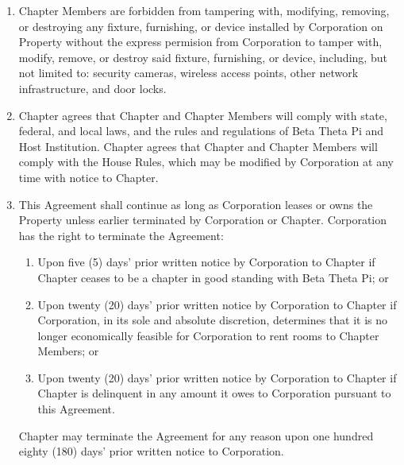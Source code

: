 \documentclass[12pt]{article}
\begin{document}
\begin{enumerate}
        \item Chapter Members are forbidden from tampering with, modifying, removing, or destroying any fixture, furnishing, or device installed by Corporation on Property without the express permision from Corporation to tamper with, modify, remove, or destroy said fixture, furnishing, or device, including, but not limited to: security cameras, wireless access points, other network infrastructure, and door locks.

        \item Chapter agrees that Chapter and Chapter Members will comply with state, federal, and local laws, and the rules and regulations of Beta Theta Pi and Host Institution.
                Chapter agrees that Chapter and Chapter Members will comply with the House Rules, which may be modified by Corporation at any time with notice to Chapter.

        \item This Agreement shall continue as long as Corporation leases or owns the Property unless earlier terminated by Corporation or Chapter. Corporation has the right to terminate the Agreement:

                \begin{enumerate}[label=\alph*.]
                        \item Upon five (5) days' prior written notice by Corporation to Chapter if Chapter ceases to be a chapter in good standing with Beta Theta Pi; or

                        \item Upon twenty (20) days' prior written notice by Corporation to Chapter if Corporation, in its sole and absolute discretion, determines that it is no longer economically feasible for Corporation to rent rooms to Chapter Members; or

                        \item Upon twenty (20) days' prior written notice by Corporation to Chapter if Chapter is delinquent in any amount it owes to Corporation pursuant to this Agreement.
                \end{enumerate}

        Chapter may terminate the Agreement for any reason upon one hundred eighty (180) days' prior written notice to Corporation.


\end{enumerate}
\end{document}
